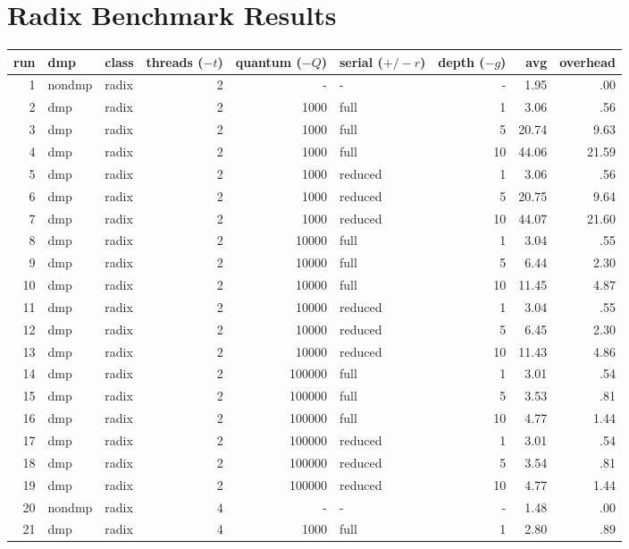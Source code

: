 \appendix

\chapter{Radix Benchmark Results}

\begin{center}
\begin{small}
\begin{longtable}{rllrrlrrr}
\hline
run & dmp & class & threads ($-t$) & quantum ($-Q$) & serial ($+/-r$) & depth ($-g$) & avg & overhead\\
\hline
 1 & nondmp & radix & 2 & - & - & - & 1.95 & .00\\
 2 & dmp & radix & 2 & 1000 & full & 1 & 3.06 & .56\\
 3 & dmp & radix & 2 & 1000 & full & 5 & 20.74 & 9.63\\
 4 & dmp & radix & 2 & 1000 & full & 10 & 44.06 & 21.59\\
 5 & dmp & radix & 2 & 1000 & reduced & 1 & 3.06 & .56\\
 6 & dmp & radix & 2 & 1000 & reduced & 5 & 20.75 & 9.64\\
 7 & dmp & radix & 2 & 1000 & reduced & 10 & 44.07 & 21.60\\
 8 & dmp & radix & 2 & 10000 & full & 1 & 3.04 & .55\\
 9 & dmp & radix & 2 & 10000 & full & 5 & 6.44 & 2.30\\
10 & dmp & radix & 2 & 10000 & full & 10 & 11.45 & 4.87\\
11 & dmp & radix & 2 & 10000 & reduced & 1 & 3.04 & .55\\
12 & dmp & radix & 2 & 10000 & reduced & 5 & 6.45 & 2.30\\
13 & dmp & radix & 2 & 10000 & reduced & 10 & 11.43 & 4.86\\
14 & dmp & radix & 2 & 100000 & full & 1 & 3.01 & .54\\
15 & dmp & radix & 2 & 100000 & full & 5 & 3.53 & .81\\
16 & dmp & radix & 2 & 100000 & full & 10 & 4.77 & 1.44\\
17 & dmp & radix & 2 & 100000 & reduced & 1 & 3.01 & .54\\
18 & dmp & radix & 2 & 100000 & reduced & 5 & 3.54 & .81\\
19 & dmp & radix & 2 & 100000 & reduced & 10 & 4.77 & 1.44\\
\hline
20 & nondmp & radix & 4 & - & - & - & 1.48 & .00\\
21 & dmp & radix & 4 & 1000 & full & 1 & 2.80 & .89\\

\end{longtable}
\end{small}
\end{center}
